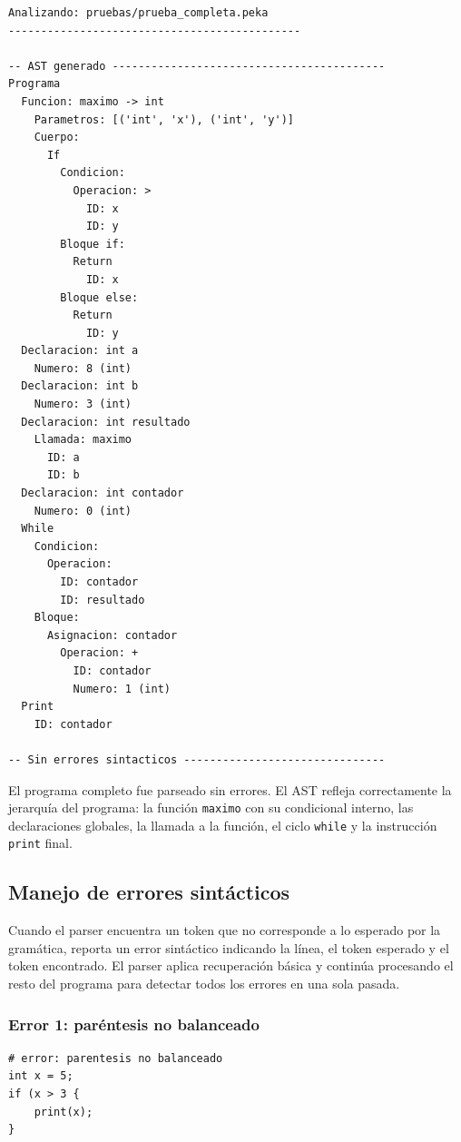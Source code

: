 \documentclass[12pt]{article}
\begin{document}
\begin{lstlisting}[caption={AST generado -- prueba\_completa.peka}]
Analizando: pruebas/prueba_completa.peka
---------------------------------------------

-- AST generado ------------------------------------------
Programa
  Funcion: maximo -> int
    Parametros: [('int', 'x'), ('int', 'y')]
    Cuerpo:
      If
        Condicion:
          Operacion: >
            ID: x
            ID: y
        Bloque if:
          Return
            ID: x
        Bloque else:
          Return
            ID: y
  Declaracion: int a
    Numero: 8 (int)
  Declaracion: int b
    Numero: 3 (int)
  Declaracion: int resultado
    Llamada: maximo
      ID: a
      ID: b
  Declaracion: int contador
    Numero: 0 (int)
  While
    Condicion:
      Operacion: 
        ID: contador
        ID: resultado
    Bloque:
      Asignacion: contador
        Operacion: +
          ID: contador
          Numero: 1 (int)
  Print
    ID: contador

-- Sin errores sintacticos -------------------------------
\end{lstlisting}

\noindent
El programa completo fue parseado sin errores. El AST refleja
correctamente la jerarquía del programa: la función \texttt{maximo}
con su condicional interno, las declaraciones globales, la llamada
a la función, el ciclo \texttt{while} y la instrucción \texttt{print}
final.

\subsection{Manejo de errores sintácticos}

Cuando el parser encuentra un token que no corresponde a lo esperado
por la gramática, reporta un error sintáctico indicando la línea, el
token esperado y el token encontrado. El parser aplica recuperación
básica y continúa procesando el resto del programa para detectar todos
los errores en una sola pasada.

\subsubsection{Error 1: paréntesis no balanceado}

\begin{lstlisting}[caption={error\_sintactico1.peka}]
# error: parentesis no balanceado
int x = 5;
if (x > 3 {
    print(x);
}
\end{lstlisting}
\end{document}
